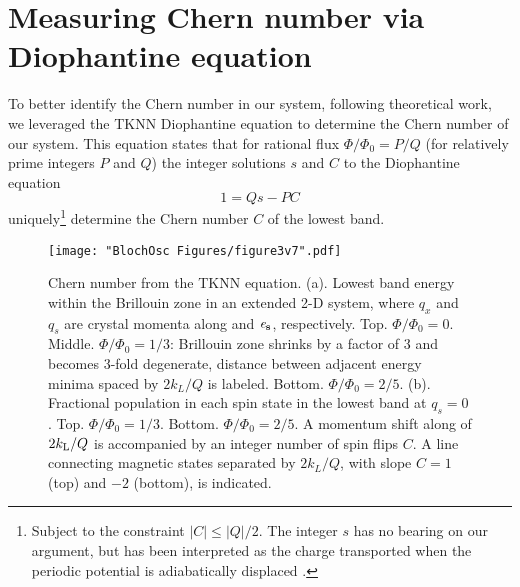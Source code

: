\section{Measuring Chern number via Diophantine equation}
To better identify the Chern number in our system, following theoretical work\cite{Huang2013,Liu2013,Wang2013,Zhang2016,Mugel2017}, we leveraged the TKNN Diophantine equation to determine the Chern number of our system. This equation states that for rational flux $\Phi/\Phi_0 = P/Q$ (for relatively prime integers $P$ and $Q$) the integer solutions  $s$ and $C$ to the Diophantine equation
\begin{equation}
1 = Q s - P C
\label{eqn:Diophantine}
\end{equation}  
uniquely\footnote{Subject to the constraint $|C|\leq |Q|/2$\cite{Thouless1982, Kohmoto1989}. The integer $s$ has no bearing on our argument, but has been interpreted as the charge transported when the periodic potential is adiabatically displaced \cite{MacDonald1984,Kunz1986}.} determine the Chern number $C$ of the lowest band.

\begin{figure}
\texttt{[image: "BlochOsc Figures/figure3v7".pdf]}
\caption[Chern number from the TKNN equation ]{Chern number from the TKNN equation. (a). Lowest band energy within the Brillouin zone in an extended 2-D system, where $q_x$ and $q_s$ are crystal momenta along \ex and $\bf{\mathit{e}_s}$, respectively. Top. $\Phi/\Phi_0=0$. Middle. $\Phi/\Phi_0=1/3$: Brillouin zone shrinks by a factor of $3$ and becomes 3-fold degenerate, distance between adjacent energy minima spaced by $2k_L/Q$ is labeled. Bottom. $\Phi/\Phi_0=2/5$. (b).  Fractional population in each spin state in the lowest band at $q_s=0$. Top. $\Phi/\Phi_0=1/3$. Bottom. $\Phi/\Phi_0=2/5$. A momentum shift along \ex of $2k_{\rm{L}}/Q$ is accompanied by an integer number of spin flips $C$. A line connecting magnetic states separated by $2k_L/Q$, with slope $C=1$ (top) and $-2$ (bottom), is indicated. }
\label{fig:Diophantine}
\end{figure}

